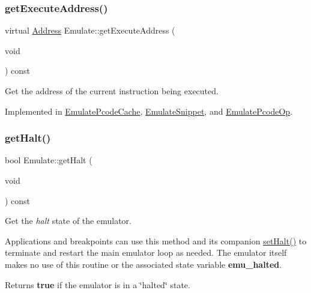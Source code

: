 \subsubsection{\texorpdfstring{getExecuteAddress()}{getExecuteAddress()}}
{\footnotesize\ttfamily virtual \mbox{\hyperlink{class_address}{Address}} Emulate\+::get\+Execute\+Address (\begin{DoxyParamCaption}\item[{void}]{ }\end{DoxyParamCaption}) const\hspace{0.3cm}{\ttfamily [pure virtual]}}



Get the address of the current instruction being executed. 



Implemented in \mbox{\hyperlink{class_emulate_pcode_cache_a0552fb840bb762ee41b4bbc7fce2b608}{Emulate\+Pcode\+Cache}}, \mbox{\hyperlink{class_emulate_snippet_aef11e510794c009453333e847acc38e9}{Emulate\+Snippet}}, and \mbox{\hyperlink{class_emulate_pcode_op_a55356dba15ee255dc6d9a7d2dd3832c0}{Emulate\+Pcode\+Op}}.

\mbox{\label{class_emulate_ab1f2882dd3554c18c60e817e80f3c4bc}} 
\subsubsection{\texorpdfstring{getHalt()}{getHalt()}}
{\footnotesize\ttfamily bool Emulate\+::get\+Halt (\begin{DoxyParamCaption}\item[{void}]{ }\end{DoxyParamCaption}) const\hspace{0.3cm}{\ttfamily [inline]}}



Get the {\itshape halt} state of the emulator. 

Applications and breakpoints can use this method and its companion \mbox{\hyperlink{class_emulate_a4858bc80cf7b078a592f9c8d3442450d}{set\+Halt()}} to terminate and restart the main emulator loop as needed. The emulator itself makes no use of this routine or the associated state variable {\bfseries{emu\+\_\+halted}}. \begin{DoxyReturn}{Returns}
{\bfseries{true}} if the emulator is in a \char`\"{}halted\char`\"{} state. 
\end{DoxyReturn}



